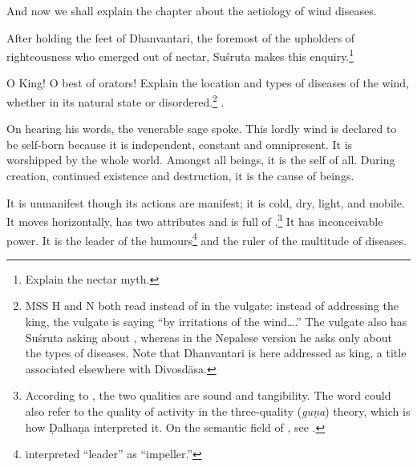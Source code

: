 \begin{translation}

\item [1] 

	And now we shall explain the chapter about the aetiology of wind
	diseases.



\item[3]

	After holding the feet of Dhanvantari, the foremost of the upholders of
	righteousness who emerged out of nectar, Suśruta makes this
	enquiry.\footnote{Explain the nectar myth.}

\item[4]
 

	O King! O best of orators! Explain the location and types of diseases of
	the wind, whether in its natural state or disordered.\footnote{MSS H and
	N both read  instead of  in the vulgate:
	instead of addressing the king, the vulgate is saying “by irritations of
	the wind\ldots.”  The vulgate also has Suśruta asking about ,
	whereas in the Nepalese version he asks only about the types of
	diseases. Note that Dhanvantari is here addressed as king, a title
	associated elsewhere with Divosdāsa.}
	.

\item[5--9]

	On hearing his words, the venerable sage spoke.  This lordly wind is
	declared to be self-born because it is independent, constant and
	omnipresent. It is worshipped by the whole world. Amongst all beings, it
	is the self of all. During creation, continued existence and
	destruction, it is the cause of beings. 

	It is unmanifest though its actions are manifest; it is cold, dry,
	light, and mobile.  It moves horizontally, has two attributes and is
	full of .\footnote{According to ,
	the two qualities are sound and tangibility.  The word  could
	also refer to the quality of activity in the three-quality (\emph{guṇa})
	theory, which is how Ḍalhaṇa interpreted it.  On the semantic field of
	, see \cite[14 note 26 and ff.]{das-2003}.} %
	It has inconceivable power. It is the leader of the
	humours\footnote{ interpreted  “leader” as
	 “impeller.”} and the ruler of the multitude of diseases.
    

\end{translation}

